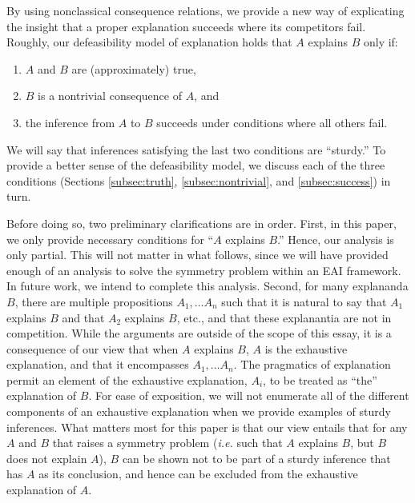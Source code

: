 \documentclass[natbib]{svjour3}                     %
\begin{document}
By using nonclassical consequence relations, we provide a new way of explicating the insight that a proper explanation succeeds where its competitors fail. Roughly, our defeasibility model of explanation  holds that $A$ explains $B$ only if: 

\begin{enumerate}
	\item $A$ and $B$ are (approximately) true,
	\item $B$ is a nontrivial consequence of $A$, and
	\item the inference from $A$ to $B$ succeeds under conditions where all others fail.
\end{enumerate}

\noindent We will say that  inferences satisfying the last two conditions are ``sturdy.''  To provide a better sense of  the defeasibility model, we discuss each of the three conditions (Sections \ref{subsec:truth}, \ref{subsec:nontrivial}, and \ref{subsec:success}) in turn.

Before doing so, two preliminary clarifications are in order. First,  in this paper, we only provide necessary conditions for ``$A$ explains $B$.'' Hence, our analysis is only partial. This will not matter in what follows, since we will have provided enough of an analysis to solve the symmetry problem within an EAI framework. In future work, we intend to complete this analysis. Second, for many explananda $B$, there are multiple propositions $A_1, \dots A_n$­ such that it is natural to say that $A_1$ explains $B$ and that $A_2$ explains $B$, etc., and that these explanantia are not in competition. While the arguments are outside of the scope of this essay, it is a consequence of our view that when $A$ explains $B$, $A$ is the exhaustive explanation, and that it encompasses $A_1, \dots A_n$.  The pragmatics of explanation permit an element of the exhaustive explanation, $A_i$, to be treated as ``the'' explanation of $B$. For ease of exposition, we will not enumerate all of the different components of an exhaustive explanation when we provide examples of sturdy inferences. What matters most for this paper is that our view entails that for any $A$ and $B$ that raises a symmetry problem (\textit{i.e.} such that $A$ explains $B$, but $B$ does not explain $A$), $B$ can be shown not to be part of a sturdy inference that has $A$ as its conclusion, and hence can be excluded from the exhaustive explanation of $A$.
\end{document}

